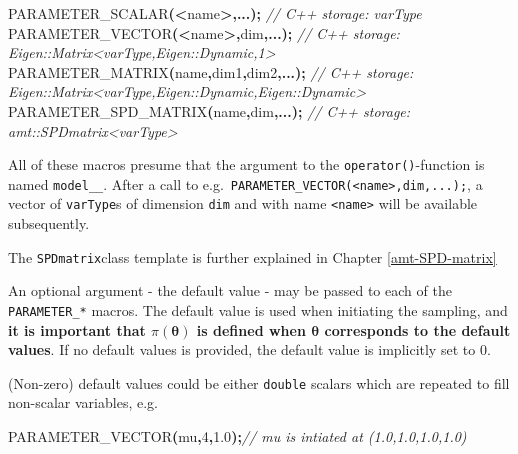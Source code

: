 \documentclass[
]{book}
\newenvironment{Shaded}{\begin{snugshade}}{\end{snugshade}}
\newcommand{\CommentTok}[1]{\textcolor[rgb]{0.56,0.35,0.01}{\textit{#1}}}
\newcommand{\DecValTok}[1]{\textcolor[rgb]{0.00,0.00,0.81}{#1}}
\newcommand{\FloatTok}[1]{\textcolor[rgb]{0.00,0.00,0.81}{#1}}
\newcommand{\NormalTok}[1]{#1}
\newcommand{\OperatorTok}[1]{\textcolor[rgb]{0.81,0.36,0.00}{\textbf{#1}}}
\begin{document}
\begin{Shaded}
\begin{Highlighting}[]
\NormalTok{PARAMETER\_SCALAR}\OperatorTok{(\textless{}}\NormalTok{name}\OperatorTok{\textgreater{},...);} \CommentTok{// C++ storage: varType}
\NormalTok{PARAMETER\_VECTOR}\OperatorTok{(\textless{}}\NormalTok{name}\OperatorTok{\textgreater{},}\NormalTok{dim}\OperatorTok{,...);} 
\CommentTok{// C++ storage: Eigen::Matrix\textless{}varType,Eigen::Dynamic,1\textgreater{}  }
\NormalTok{PARAMETER\_MATRIX}\OperatorTok{(}\NormalTok{name}\OperatorTok{,}\NormalTok{dim1}\OperatorTok{,}\NormalTok{dim2}\OperatorTok{,...);} 
\CommentTok{// C++ storage: Eigen::Matrix\textless{}varType,Eigen::Dynamic,Eigen::Dynamic\textgreater{}}
\NormalTok{PARAMETER\_SPD\_MATRIX}\OperatorTok{(}\NormalTok{name}\OperatorTok{,}\NormalTok{dim}\OperatorTok{,...);}
\CommentTok{// C++ storage: amt::SPDmatrix\textless{}varType\textgreater{}}
\end{Highlighting}
\end{Shaded}

All of these macros presume that the argument to the \texttt{operator()}-function is named \texttt{model\_\_}. After a call to e.g.~\texttt{PARAMETER\_VECTOR(\textless{}name\textgreater{},dim,...);}, a vector of \texttt{varType}s of dimension \texttt{dim} and with name \texttt{\textless{}name\textgreater{}} will be available subsequently.

The \texttt{SPDmatrix}class template is further explained in Chapter \ref{amt-SPD-matrix}

An optional argument - the default value - may be passed to each of the
\texttt{PARAMETER\_*} macros. The default value is used when initiating the sampling, and \textbf{it is important that \(\pi(\boldsymbol \theta)\) is defined when \(\boldsymbol \theta\) corresponds to the default values}. If no default values is provided, the default value is implicitly set to \(0\).

(Non-zero) default values could be either \texttt{double} scalars which are repeated to fill non-scalar variables, e.g.

\begin{Shaded}
\begin{Highlighting}[]
\NormalTok{PARAMETER\_VECTOR}\OperatorTok{(}\NormalTok{mu}\OperatorTok{,}\DecValTok{4}\OperatorTok{,}\FloatTok{1.0}\OperatorTok{);}\CommentTok{// mu is intiated at (1.0,1.0,1.0,1.0)}
\end{Highlighting}
\end{Shaded}
\end{document}
